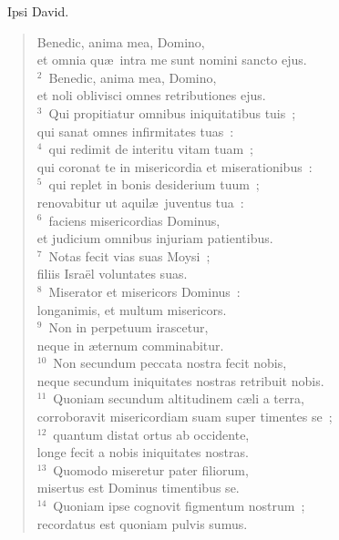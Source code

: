~\lettrine[lines=10,image=true,loversize=0.05,lraise=-0.03]{I}{}psi David. \begin{flushleft}\begin{verse}\vspace{6pt}Benedic, anima mea, Domino,\\ et omnia qu\ae\ intra me sunt nomini sancto ejus.\\
${}^{2}$~Benedic, anima mea, Domino,\\ et noli oblivisci omnes retributiones ejus.\\
${}^{3}$~Qui propitiatur omnibus iniquitatibus tuis~;\\ qui sanat omnes infirmitates tuas~:\\
${}^{4}$~qui redimit de interitu vitam tuam~;\\ qui coronat te in misericordia et miserationibus~:\\
${}^{5}$~qui replet in bonis desiderium tuum~;\\ renovabitur ut aquil\ae\ juventus tua~:\\
${}^{6}$~faciens misericordias Dominus,\\ et judicium omnibus injuriam patientibus.\\
${}^{7}$~Notas fecit vias suas Moysi~;\\ filiis Isra\"el voluntates suas.\\
${}^{8}$~Miserator et misericors Dominus~:\\ longanimis, et multum misericors.\\
${}^{9}$~Non in perpetuum irascetur,\\ neque in \ae ternum comminabitur.\\
${}^{10}$~Non secundum peccata nostra fecit nobis,\\ neque secundum iniquitates nostras retribuit nobis.\\
${}^{11}$~Quoniam secundum altitudinem c\ae li a terra,\\ corroboravit misericordiam suam super timentes se~;\\
${}^{12}$~quantum distat ortus ab occidente,\\ longe fecit a nobis iniquitates nostras.\\
${}^{13}$~Quomodo miseretur pater filiorum,\\ misertus est Dominus timentibus se.\\
${}^{14}$~Quoniam ipse cognovit figmentum nostrum~;\\ recordatus est quoniam pulvis sumus.\\

\end{verse}
\end{flushleft}
